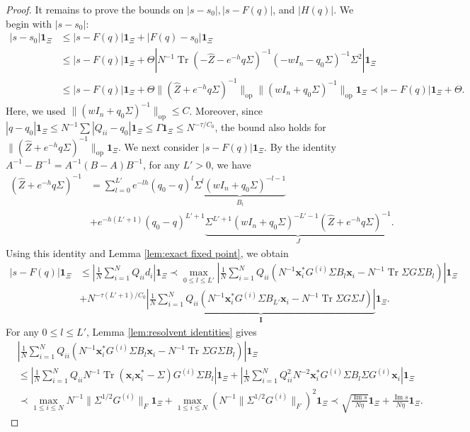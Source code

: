 \documentclass[11pt,reqno]{amsart}
\def\x{\mathbf{x}}
\def\1{\mathbf{1}}
\def\Im{\operatorname{Im}}
\def\op{\mathrm{op}}
\def\Tr{\operatorname{Tr}}
\theoremstyle{definition}
\numberwithin{equation}{section}
\numberwithin{figure}{section}
\begin{document}
\begin{proof}
It remains to prove the bounds on $|s-s_0|,|s-F(q)|$, and $|H(q)|$. We begin with $|s-s_0|$:
\begin{align*}
    |s-s_0|\1_\Xi&\leq |s-F(q)|\1_\Xi+|F(q)-s_0|\1_\Xi\\
    &\leq |s-F(q)|\1_\Xi+\Theta|N^{-1}\Tr(-\hat Z-e^{-h}q\Sigma)^{-1}(-wI_n-q_0\Sigma)^{-1}\Sigma^{2}|\1_\Xi\\
    &\leq |s-F(q)|\1_\Xi+\Theta\|(\hat Z+e^{-h}q\Sigma)^{-1}\|_\op\|(wI_n+q_0\Sigma)^{-1}\|_\op\1_\Xi\prec |s-F(q)|\1_\Xi+\Theta.
\end{align*}
Here, we used $\|(wI_n+q_0\Sigma)^{-1}\|_\op\leq C$. Moreover, since $|q-q_0|\1_\Xi\leq N^{-1}\sum|Q_{ii}-q_0|\1_\Xi\leq \Gamma\1_\Xi\leq N^{-\tau/C_0}$, the bound also holds for $\|(\hat Z+e^{-h}q\Sigma)^{-1}\|_\op\1_\Xi$. We next consider $|s-F(q)|\1_\Xi$. By the identity $A^{-1}-B^{-1}=A^{-1}(B-A)B^{-1}$, for any $L'>0$, we have
\begin{align*}
    (\hat Z+e^{-h}q\Sigma)^{-1}&=\sum_{l=0}^{L'}e^{-lh}(q_0-q)^l\underbrace{\Sigma^l(wI_n+q_0\Sigma)^{-l-1}}_{B_l}\\
    &+e^{-h(L'+1)}(q_0-q)^{L'+1}\underbrace{\Sigma^{L'+1}(wI_n+q_0\Sigma)^{-L'-1}(\hat Z+e^{-h}q\Sigma)^{-1}}_{J}.
\end{align*}
Using this identity and Lemma \ref{lem:exact fixed point}, we obtain
\begin{align*}
    |s-F(q)|\1_\Xi&\leq\left|\frac{1}{N}\sum_{i=1}^NQ_{ii}d_i\right|\1_\Xi\prec \max_{0\leq l\leq L'}\left|\frac{1}{N}\sum_{i=1}^NQ_{ii}(N^{-1}\x_i^*G^{(i)}\Sigma B_l\x_i-N^{-1}\Tr\Sigma G\Sigma B_l)\right|\1_\Xi\\
    &+N^{-\tau (L'+1)/C_0}\underbrace{\left|\frac{1}{N}\sum_{i=1}^NQ_{ii}(N^{-1}\x_i^*G^{(i)}\Sigma B_{L'}\x_i-N^{-1}\Tr\Sigma G\Sigma J)\right|}_{\mathbf{I}}\1_\Xi .
\end{align*}
For any $0\leq l\le L'$, Lemma \ref{lem:resolvent identities} gives
\begin{align*}
    &\left|\frac{1}{N}\sum_{i=1}^NQ_{ii}(N^{-1}\x_i^*G^{(i)}\Sigma B_l\x_i-N^{-1}\Tr\Sigma G\Sigma B_l)\right|\1_\Xi\\
    &\leq \left|\frac{1}{N}\sum_{i=1}^NQ_{ii}N^{-1}\Tr(\x_i\x_i^*-\Sigma)G^{(i)}\Sigma B_l\right|\1_\Xi+\left|\frac{1}{N}\sum_{i=1}^NQ_{ii}^2N^{-2}\x_i^*G^{(i)}\Sigma B_l\Sigma G^{(i)}\x_i\right|\1_\Xi\\
    &\prec\max_{1\leq i\leq N}N^{-1}\|\Sigma^{1/2}G^{(i)}\|_F\1_\Xi+\max_{1\leq i\leq N}(N^{-1}\|\Sigma^{1/2}G^{(i)}\|_F)^2\1_\Xi\prec \sqrt{\frac{\Im s}{N\eta}}\1_\Xi+\frac{\Im s}{N\eta}\1_\Xi.

\end{align*}
\end{proof}
\end{document}
